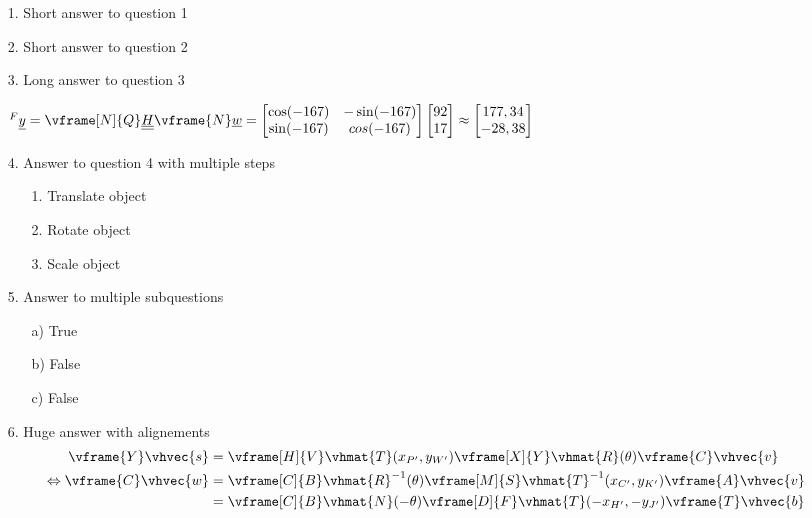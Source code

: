 \documentclass{gif7001}
\begin{document}
\vshort

\begin{enumerate}
    \item[1.] Short answer to question 1
    \item[2.] Short answer to question 2
    \item[3.] Long answer to question 3
    
    $^F\vvec{y} = \vframe[N]{Q}\vmat{H} \vframe{N}\vvec{w} = \begin{bmatrix} \cos(-167) & -\sin(-167) \\ \sin(-167) & cos(-167) \end{bmatrix} \begin{bmatrix} 92 \\ 17 \end{bmatrix} \approx \begin{bmatrix} 177,34 \\ -28,38 \end{bmatrix}$
    \item[4.] Answer to question 4 with multiple steps
    \begin{enumerate}
        \item[1.] Translate object
        \item[2.] Rotate object
        \item[3.] Scale object
    \end{enumerate}
    \item[5.] Answer to multiple subquestions
    \begin{enumerate}
        \item[a)] True
        \item[b)] False
        \item[c)] False
    \end{enumerate}
    \item[6.] Huge answer with alignements
    \begin{align*}
        \vframe{Y}\vhvec{s} &= \vframe[H]{V}\vhmat{T}(x_{P'},y_{W'}) \vframe[X]{Y}\vhmat{R}(\theta) \vframe{C}\vhvec{v} \\
        \Leftrightarrow \vframe{C}\vhvec{w} &= \vframe[C]{B}\vhmat{R}^{-1}(\theta) \vframe[M]{S}\vhmat{T}^{-1}(x_{C'},y_{K'}) \vframe{A}\vhvec{v} \\
        &= \vframe[C]{B}\vhmat{N}(-\theta) \vframe[D]{F}\vhmat{T}(-x_{H'},-y_{J'}) \vframe{T}\vhvec{b} \\

\end{align*}
\end{enumerate}
\end{document}
